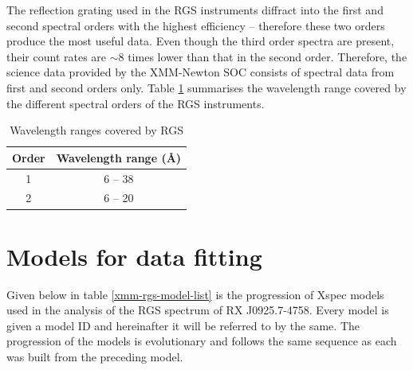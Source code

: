 		The reflection grating used in the RGS instruments diffract into the first and second spectral orders with the highest efficiency -- therefore these two orders produce the most useful data. Even though the third order spectra are present, their count rates are $\sim 8$ times lower than that in the second order. Therefore, the science data provided by the XMM-Newton SOC consists of spectral data from first and second orders only. Table \ref{xmm-rgs-wavelength} summarises the wavelength range covered by the different spectral orders of the RGS instruments.
		\begin{table}[h!]
			\centering
			\caption{Wavelength ranges covered by RGS}
			\label{xmm-rgs-wavelength}
			\begin{tabular}{|c|c|}
				\hline
				{\textbf{Order}} & {\textbf{Wavelength range (\AA)}} \\
				\hline
				{1} & {6 -- 38} \\
				\hline
				{2} & {6 -- 20} \\
				\hline
			\end{tabular}
		\end{table}
	
	\section{Models for data fitting} \label{hi-resolution:models}
		Given below in table \ref{xmm-rgs-model-list} is the progression of Xspec models used in the analysis of the RGS spectrum of RX J0925.7-4758. Every model is given a model ID and hereinafter it will be referred to by the same. The progression of the models is evolutionary and follows the same sequence as each was built from the preceding model.
		
